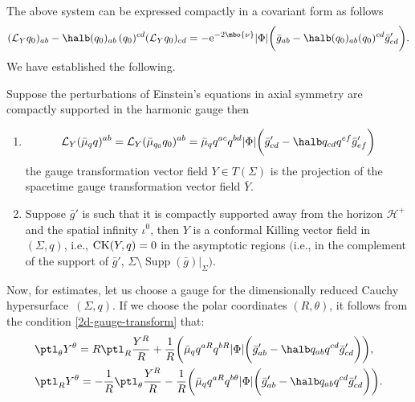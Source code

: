  The above system can be expressed compactly in a covariant form as follows
\begin{align*}
(\mathcal{L}_{Y} q_0)_{ab} - \halb (q_0)_{ab}\, (q_0)^{cd} (\mathcal{L}_{Y} q_0)_{cd}=-{\rm e}^{-2 \mbo{\nu}} \vert \Phi \vert \biggl(\bar{g}_{ab} - \halb (q_0)_{ab} (q_0)^{cd} \bar{g}'_{cd} \biggr).
\end{align*}
We have established the following.
\begin{Lemma} \label{Y-conformal-killing}
	Suppose the perturbations of Einstein's equations in axial symmetry are compactly supported in the harmonic gauge then
	\begin{enumerate}\itemsep=0pt
		\item[$(1)$] 	
		\begin{align} \label{2d-gauge-transform}
		\mathcal{L}_Y (\bar{\mu}_q q) ^{ab} = \mathcal{L}_Y (\bar{\mu}_{q_0} q_0) ^{ab}= \bar{\mu}_q q^{ac} q^{bd} \vert \Phi \vert \biggl(\bar{g}'_{cd} - \halb q_{cd} q^{ef} \bar{g}'_{ef}\biggr)
		\end{align}
		the gauge transformation vector field $Y \in T(\Sigma)$ is the projection of the spacetime gauge transformation vector field $\bar{Y}$.
	
	\item[$(2)$] Suppose $\bar{g}'$ is such that it is compactly supported away from the horizon $\mathcal{H^+}$ and the spatial infinity $\iota^0$, then $Y$	is a conformal Killing vector field in $(\Sigma, q)$, i.e., ${\rm CK}(Y, q) = 0$ in the asymptotic regions $($i.e., in the complement of the support of $\bar{g}'$, $\Sigma \setminus \operatorname{Supp}(\bar{g}) \vert_{\Sigma})$.
\end{enumerate}
\end{Lemma}

Now, for estimates, let us choose a gauge for the dimensionally reduced Cauchy hypersurface~$(\Sigma, q)$. If we choose the polar coordinates $(R, \theta)$, it follows from the condition \eqref{2d-gauge-transform} that:
\begin{subequations}\label{Y-theta-transport}
\begin{align}
&\ptl_ \theta Y^\theta= R \ptl_R \frac{Y^R}{R} + \frac{1}{R} \biggl(\bar{\mu}_q q^{aR} q^{bR} \vert \Phi \vert \biggl(\bar{g}'_{ab} - \halb q_{ab} q^{cd} \bar{g}'_{cd}\biggr) \biggr), \\
&\ptl_R Y^\theta= - \frac{1}{R} \ptl_\theta \frac{Y^R}{R} - \frac{1}{R} \biggl(\bar{\mu}_q q^{aR} q^{b\theta} \vert \Phi \vert \biggl(\bar{g}'_{ab} - \halb q_{ab} q^{cd} \bar{g}'_{cd}\biggr)\biggr).
\end{align}
\end{subequations}

